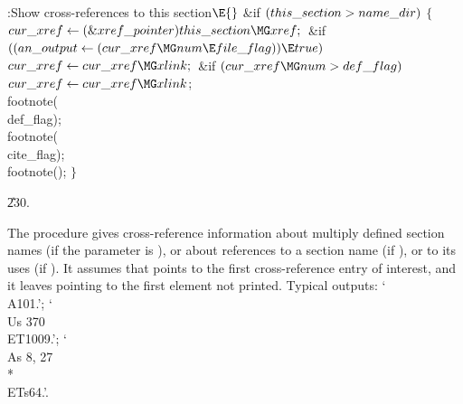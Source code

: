 \Y\B\4:Show cross-references to this section\X${}\E{}$\6
\&{if} ${}(\\{this\_section}>\\{name\_dir}){}$\5
${}\{{}$\1\6
${}\\{cur\_xref}\K(\&{xref\_pointer})\,\\{this\_section}\MG\\{xref};{}$\6
\&{if} ${}((\\{an\_output}\K(\\{cur\_xref}\MG\\{num}\E\\{file\_flag}))\E%
\\{true}){}$\1\5
${}\\{cur\_xref}\K\\{cur\_xref}\MG\\{xlink};{}$\2\6
\&{if} ${}(\\{cur\_xref}\MG\\{num}>\\{def\_flag}){}$\1\5
${}\\{cur\_xref}\K\\{cur\_xref}\MG\\{xlink}{}$;\2\6
\\{footnote}(\\{def\_flag});\6
\\{footnote}(\\{cite\_flag});\6
\\{footnote}();\6
\4${}\}{}$\2\par
\U230.\fi

The  procedure gives cross-reference information about
multiply defined section names (if the  parameter is
), or about references to a section name
(if ), or to its uses (if ). It assumes that
 points to the first cross-reference entry of interest, and
it
leaves  pointing to the first element not printed.  Typical
outputs:
`\.{\\A101.}'; `\.{\\Us 370\\ET1009.}';
`\.{\\As 8, 27\\*\\ETs64.}'.

